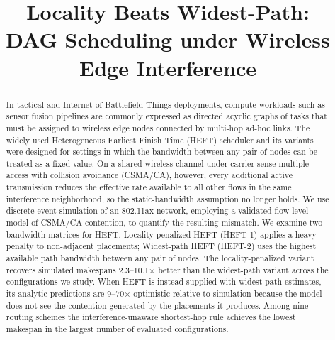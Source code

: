 \documentclass[conference]{IEEEtran}
\newcommand{\heftone}{HEFT-1}
\newcommand{\hefttwo}{HEFT-2}
\begin{document}
\title{Locality Beats Widest-Path:\\DAG Scheduling under Wireless Edge Interference}

\author{%
\and
{}
\and
{}
}

\maketitle

\begin{abstract}
In tactical and Internet-of-Battlefield-Things deployments, compute
workloads such as sensor fusion pipelines are commonly expressed as
directed acyclic graphs of tasks that must be assigned to wireless edge
nodes connected by multi-hop ad-hoc links. The widely used Heterogeneous
Earliest Finish Time (HEFT) scheduler and its variants were designed for
settings in which the bandwidth between any pair of nodes can be treated
as a fixed value. On a shared wireless channel under carrier-sense multiple access with
collision avoidance (CSMA/CA), however, every additional active
transmission reduces the effective rate available to all other flows in
the same interference neighborhood, so the static-bandwidth assumption no
longer holds. We use discrete-event simulation of an 802.11ax network,
employing a validated flow-level model of CSMA/CA contention, to quantify the resulting mismatch. We examine two bandwidth matrices
for HEFT. Locality-penalized HEFT (\heftone{}) applies a heavy penalty to
non-adjacent placements; Widest-path HEFT (\hefttwo{}) uses the highest
available path bandwidth between any pair of nodes. The locality-penalized
variant recovers simulated makespans 2.3--10.1$\times$ better than the
widest-path variant across the configurations we study. When HEFT is
instead supplied with widest-path estimates, its analytic predictions are
9--70$\times$ optimistic relative to simulation because the model does not
see the contention generated by the placements it produces. Among nine
routing schemes the interference-unaware shortest-hop rule achieves the
lowest makespan in the largest number of evaluated configurations.
\end{abstract}
\end{document}
